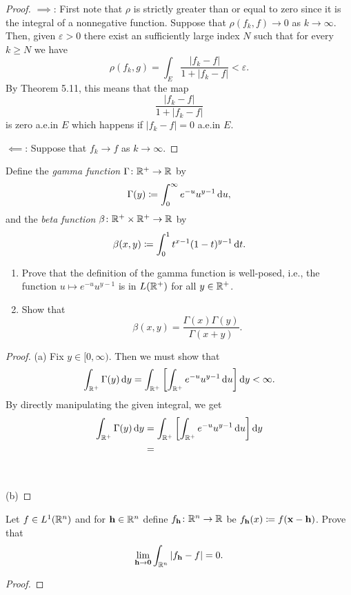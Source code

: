 \begin{proof}
$\implies$: First note that $\rho$ is strictly greater than or equal to
zero since it is the integral of a nonnegative function. Suppose that
$\rho(f_k,f)\to 0$ as $k\to\infty$. Then, given $\varepsilon>0$ there exist
an sufficiently large index $N$ such that for every $k\geq N$ we have
\begin{equation}
\label{eq:hypothesis-4}
\rho(f_k,g)=\int_E\frac{|f_k-f|}{1+|f_k-f|}<\varepsilon.
\end{equation}
By Theorem 5.11, this means that the map
\[
\frac{|f_k-f|}{1+|f_k-f|}
\]
is zero a.e.\@ in $E$ which happens if $|f_k-f|=0$ a.e.\@ in $E$.

$\impliedby$: Suppose that $f_k\to f$ as $k\to\infty$.
\end{proof}

\begin{problem}
Define the \emph{gamma function} $\Gamma\colon\mathbb{R}^+\to\mathbb{R}$ by
\[
\Gamma(y)\coloneqq\int_0^\infty e^{-u}u^{y-1}\mathop{}\!\mathrm{d} u,
\]
and the \emph{beta function} $\beta\colon\mathbb{R}^+\times\mathbb{R}^+\to\mathbb{R}$
by
\[
\beta(x,y)\coloneqq\int_0^1 t^{x-1}(1-t)^{y-1}\mathop{}\!\mathrm{d} t.
\]
\begin{enumerate}[label=(\alph*)]
\item Prove that the definition of the gamma function is well-posed, i.e.,
the function $u\mapsto e^{-u}u^{y-1}$ is in $L(\mathbb{R}^+)$ for all
$y\in\mathbb{R}^+$.
\item Show that
\[
\beta(x,y)=\frac{\Gamma(x)\Gamma(y)}{\Gamma(x+y)}.
\]
\end{enumerate}
\end{problem}
\begin{proof}
(a) Fix $y\in[0,\infty)$. Then we must show that
\begin{equation}
\label{eq:desired-inequality-5}
\int_{\mathbb{R}^+}\Gamma(y)\mathop{}\!\mathrm{d} y=\int_{\mathbb{R}^+}\left[\int_{\mathbb{R}^+}
  e^{-u}u^{y-1}\mathop{}\!\mathrm{d} u\right]\mathop{}\!\mathrm{d} y<\infty.
\end{equation}
By directly manipulating the given integral, we get
\begin{align*}
\int_{\mathbb{R}^+}\Gamma(y)\mathop{}\!\mathrm{d} y
&=\int_{\mathbb{R}^+}\left[\int_{\mathbb{R}^+}
  e^{-u}u^{y-1}\mathop{}\!\mathrm{d} u\right]\mathop{}\!\mathrm{d} y\\
&=
\end{align*}
\\\\
(b)
\end{proof}

\begin{problem}
Let $f\in L^1(\mathbb{R}^n)$ and for $\mathbf{h}\in\mathbb{R}^n$ define
$f_{\mathbf{h}}\colon\mathbb{R}^n\to\mathbb{R}$ be $f_{\mathbf{h}}(x)\coloneqq
f(\mathbf{x}-\mathbf{h})$. Prove that
\[
\lim_{\mathbf{h}\to\mathbf{0}}\int_{\mathbb{R}^n}\left|f_{\mathbf{h}}-f\right|=0.
\]
\end{problem}
\begin{proof}
\end{proof}

